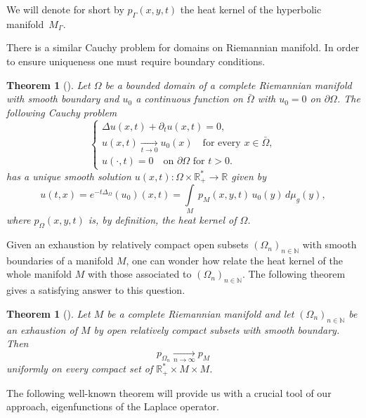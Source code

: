 \documentclass[JEP,XML,SOM,Unicode,NoFloatCountersInSection,published]{cedram}
\theoremstyle{plain}
\newtheorem{theoreme}[equation]{Theorem}
\theoremstyle{definition}
\newcommand{\RR}{\mathbb{R}}
\newcommand{\NN}{\mathbb{N}}
\newcommand{\inte}[1]{\underset{#1}{\int}}
\newcommand{\tends}[1]{\underset{#1}{\longrightarrow}}
\begin{document}
We will denote for short by $p_{\Gamma}(x,y,t)$ the heat kernel of the hyperbolic manifold~$M_{\Gamma}$.

There is a similar Cauchy problem for domains on Riemannian manifold. In order to ensure uniqueness one must require boundary conditions.

\begin{theoreme}[{\cite[p.\,168]{livrechavel}}]
\label{theocauchyprobleml2}
Let $\Omega$ be a bounded domain of a complete Riemannian manifold with smooth boundary and $u_0$ a continuous function on $\bar{\Omega}$ with $u_0 = 0$ on $\partial \Omega$. The following Cauchy problem\vspace*{-3pt}
\begin{equation}
\label{eq Cauchy problem2}
\begin{cases}
\Delta u(x,t) + \partial_t u(x,t) = 0, \\
u(x,t) \tends{t \to 0} u_0(x) \quad\text{for every } x \in \bar{\Omega}, \\
u(\cdot,t) = 0 \quad \text{on } \partial \Omega \text{ for } t > 0.
\end{cases}
\end{equation}
has a unique smooth solution $u(x,t) : \Omega \times \RR_+^* \to \RR$ given by\vspace*{-3pt}
\[
u(t,x) = e^{-t \Delta_{\Omega}}(u_0)(x,t) = \inte{M} \, p_M(x,y,t) \, u_0(y) \,d \mu_{g}(y),
\]
where $p_{\Omega}(x,y,t)$ is, by definition, the \emph{heat kernel} of $\Omega$.
\end{theoreme}

Given an exhaustion by relatively compact open subsets $(\Omega_n)_{n \in \NN}$ with smooth boundaries of a manifold $M$, one can wonder how relate the heat kernel of the whole manifold $M$ with those associated to $(\Omega_n)_{n \in \NN}$. The following theorem gives a satisfying answer to this question.

\begin{theoreme}[{\cite[Th.\,3.6]{artdodziuk}}]
\label{theododziuk}
Let $M$ be a complete Riemannian manifold and let $(\Omega_n)_{n \in \NN}$ be an exhaustion of $M$ by open relatively compact subsets with smooth boundary. Then
\[
p_{\Omega_n} \tends{n \to \infty} p_M
\]
uniformly on every compact set of $\RR^*_+ \times M \times M$.
\end{theoreme}

The following well-known theorem will provide us with a crucial tool of our approach, eigenfunctions of the Laplace operator.
\end{document}
